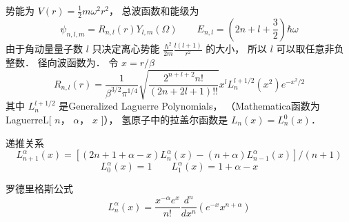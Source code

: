 

势能为 $V(r) = \frac{1}{2}m{\omega ^2}{r^2}$，  总波函数和能级为
\begin{equation}
{\psi _{n,l,m}} = {R_{n,l}}(r){Y_{l,m}}(\Omega )
\qquad
{E_{n,l}} = \left( {2n + l + \frac{3}{2}} \right)\hbar \omega 
\end{equation}    
由于角动量量子数 $l$ 只决定离心势能 $\frac{{{\hbar ^2}}}{{2m}}\frac{{l(l + 1)}}{{{r^2}}}$  的大小， 所以 $l$ 可以取任意非负整数． 径向波函数为． 令 $x = r/\beta $
 \begin{equation}
{R_{n,l}}(r) = \frac{1}{{{\beta ^{3/2}}{\pi ^{1/4}}}}\sqrt {\frac{{{2^{n + l + 2}}n!}}{{(2n + 2l + 1)!!}}} {x^l}L_n^{l + 1/2}({x^2}){e^{ - {x^2}/2}}
\end{equation}
其中 $L_n^{l + 1/2}$ 是Generalized Laguerre Polynomials， （Mathematica函数为
LaguerreL[ $n$， $\alpha $，   $x$ ]）， 氢原子中的拉盖尔函数是 ${L_n}(x) = L_n^0(x)$． 

递推关系
 \begin{equation}
L_{n + 1}^\alpha (x) = [(2n + 1 + \alpha  - x)L_n^\alpha (x) - (n + \alpha )L_{n - 1}^\alpha (x)]/(n + 1)
\end{equation}
\begin{equation}
L_0^\alpha (x) = 1
\qquad
L_1^\alpha (x) = 1 + \alpha  - x
\end{equation}
    
罗德里格斯公式
 \begin{equation}
L_n^\alpha (x) = \frac{{{x^{ - \alpha }}{e^x}}}{{n!}}\frac{{{d^n}}}{{d{x^n}}}({e^{ - x}}{x^{n + \alpha }})
\end{equation}

